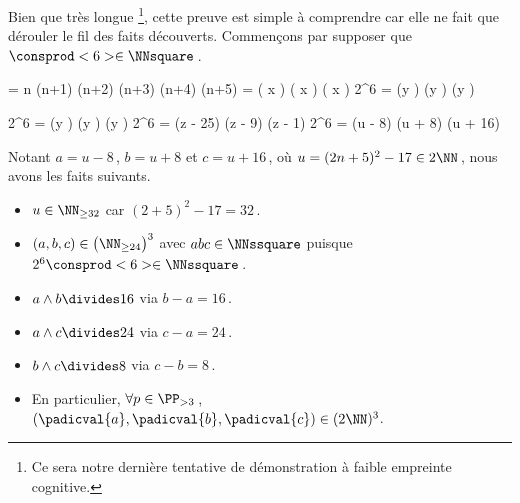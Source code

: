 Bien que très longue
\footnote{
	Ce sera notre dernière tentative de démonstration à faible empreinte cognitive.
},
cette preuve est simple à comprendre car elle ne fait que dérouler le fil des faits découverts.
Commençons par supposer que $\consprod<6> \in \NNsquare$\,.

\medskip
\begin{stepcalc}[style = ar*, ope = \iff]
	 = 
		n (n+1) (n+2) (n+3) (n+4) (n+5)
	\consprod<6> = 
		\big( x \pm {} \big) \big( x \pm {} \big) \big( x \pm {} \big)
%
	2^6 \consprod<6> = 
		(y ) (y ) (y )
\end{stepcalc}

\begin{stepcalc}[style = ar*, ope = \iff]
	2^6 \consprod<6> = 
		(y ) (y ) (y )
	2^6 \consprod<6> = 
		(z - 25) (z - 9) (z - 1) 
	2^6 \consprod<6> = 
		(u - 8) (u + 8) (u + 16)
\end{stepcalc}

\medskip

Notant $a = u - 8$\,, $b = u + 8$ et $c = u + 16$\,, où $u = (2 n + 5)^2 - 17 \in 2 \NN$\,, nous avons les faits suivants.

\begin{itemize}
	\item $u \in \NN_{\geq 32}$ car $(2 + 5)^2 - 17 = 32$\,.

	\item $(a, b, c) \in \big( \NN_{\geq 24} \big)^3$ avec $abc \in \NNssquare$ puisque $2^6 \consprod<6> \in \NNssquare$\,.

	\item $a \wedge b \divides 16$ via $b - a = 16$\,.

	\item $a \wedge c \divides 24$ via $c - a = 24$\,.

	\item $b \wedge c \divides 8$  via $c - b = 8$\,.

	\item En particulier, 
	$\forall p \in \PP_{>3}$\,, 
	$(\padicval{a}, \padicval{b}, \padicval{c}) \in ( 2 \NN )^3$.
\end{itemize}

